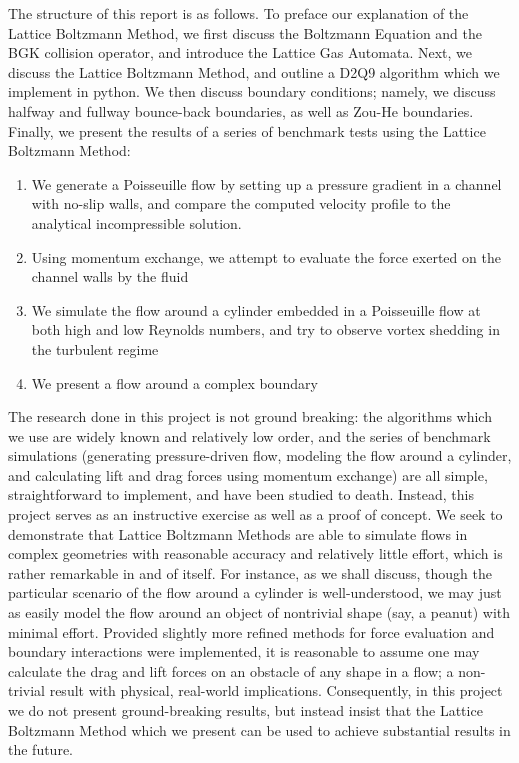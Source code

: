 \documentclass[a4paper]{article}
\begin{document}
The structure of this report is as follows. To preface our explanation of the Lattice Boltzmann Method, we first discuss the Boltzmann Equation and the BGK collision operator, and introduce the Lattice Gas Automata. Next, we discuss the Lattice Boltzmann Method, and outline a D2Q9 algorithm which we implement in python. We then discuss boundary conditions; namely, we discuss halfway and fullway bounce-back boundaries, as well as Zou-He boundaries. Finally, we present the results of a series of benchmark tests using the Lattice Boltzmann Method:
\begin{enumerate}
    \item We generate a Poisseuille flow by setting up a pressure gradient in a channel with no-slip walls, and compare the computed velocity profile to the analytical incompressible solution.
    \item Using momentum exchange, we attempt to evaluate the force exerted on the channel walls by the fluid
    \item We simulate the flow around a cylinder embedded in a Poisseuille flow at both high and low Reynolds numbers, and try to observe vortex shedding in the turbulent regime
    \item We present a flow around a complex boundary
\end{enumerate}

The research done in this project is not ground breaking: the algorithms which we use are widely known and relatively low order, and the series of benchmark simulations (generating pressure-driven flow, modeling the flow around a cylinder, and calculating lift and drag forces using momentum exchange) are all simple, straightforward to implement, and have been studied to death. Instead, this project serves as an instructive exercise as well as a proof of concept. We seek to demonstrate that Lattice Boltzmann Methods are able to simulate flows in complex geometries with reasonable accuracy and relatively little effort, which is rather remarkable in and of itself. For instance, as we shall discuss, though the particular scenario of the flow around a cylinder is well-understood, we may just as easily model the flow around an object of nontrivial shape (say, a peanut) with minimal effort. Provided slightly  more refined methods for force evaluation and boundary interactions were implemented, it is reasonable to assume one may calculate the drag and lift forces on an obstacle of any shape in a flow; a non-trivial result with physical, real-world implications. Consequently, in this project we do not present ground-breaking results, but instead insist that the Lattice Boltzmann Method which we present can be used to achieve substantial results in the future. 
\end{document}
